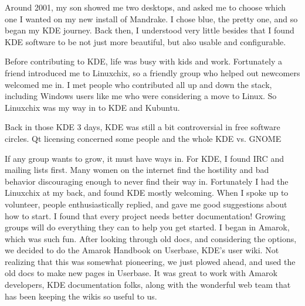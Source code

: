 

\noindent{}Around 2001, my son showed me two desktops, and asked me to choose which one I wanted on my new install of Mandrake. I chose blue, the pretty one, and so began my KDE journey. Back then, I understood very little besides that I found KDE software to be not just more beautiful, but also usable and configurable. 

Before contributing to KDE, life was busy with kids and work. Fortunately a friend introduced me to Linuxchix, so a friendly group who helped out newcomers welcomed me in. I met people who contributed all up and down the stack, including Windows users like me who were considering a move to Linux. So Linuxchix was my way in to KDE and Kubuntu.

Back in those KDE 3 days, KDE was still a bit controversial in free software circles. Qt licensing concerned some people and the whole KDE vs. GNOME 

If any group wants to grow, it must have ways in. For KDE, I found IRC and mailing lists first. Many women on the internet find the hostility and bad behavior discouraging enough to never find their way in. Fortunately I had the Linuxchix at my back, and found KDE mostly welcoming. When I spoke up to volunteer, people enthusiastically replied, and gave me good suggestions about how to start. I found that every project needs better documentation! Growing groups will do everything they can to help you get started. I began in Amarok, which was such fun. After looking through old docs, and considering the options, we decided to do the Amarok Handbook on Userbase, KDE's user wiki. Not realizing that this was somewhat pioneering, we just plowed ahead, and used the old docs to make new pages in Userbase. It was great to work with Amarok developers, KDE documentation folks, along with the wonderful web team that has been keeping the wikis so useful to us. 

